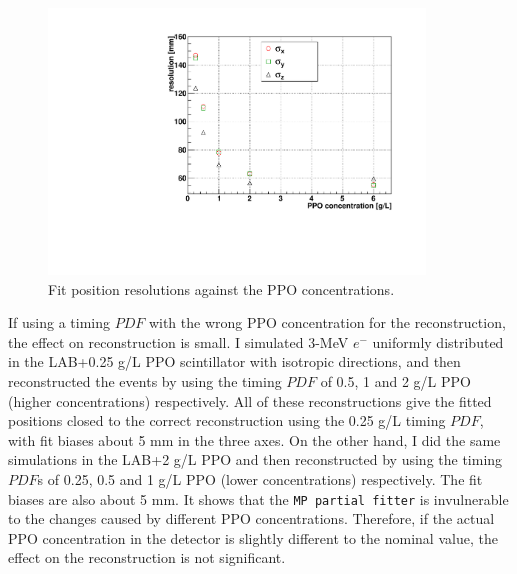 \begin{figure}[!htb]
	\centering
	\includegraphics[width=10cm]{partialResolVsPPO.pdf}
	\caption{Fit position resolutions against the PPO concentrations.}
	\label{fig:partialResolVsPPO}
\end{figure}

If using a timing $PDF$ with the wrong PPO concentration for the reconstruction, the effect on reconstruction is small\cite{partialFitterPDFtestInvulnerable}. I simulated 3-MeV $e^-$ uniformly distributed in the LAB+0.25 g/L PPO scintillator with isotropic directions, and then reconstructed the events by using the timing $PDF$ of 0.5, 1 and 2 g/L PPO (higher concentrations) respectively. All of these reconstructions give the fitted positions closed to the correct reconstruction using the 0.25 g/L timing $PDF$, with fit biases about 5 mm in the three axes. On the other hand, I did the same simulations in the LAB+2 g/L PPO and then reconstructed by using the timing $PDF$s of 0.25, 0.5 and 1 g/L PPO  (lower concentrations) respectively. The fit biases are also about 5 mm. It shows that the \texttt{MP partial fitter} is invulnerable to the changes caused by different PPO concentrations. Therefore, if the actual PPO concentration in the detector is slightly different to the nominal value, the effect on the reconstruction is not significant.

